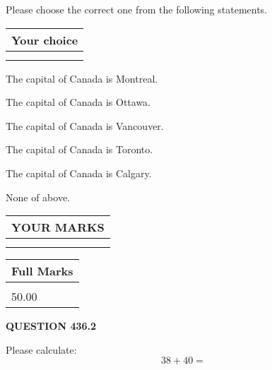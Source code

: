 \documentclass[12pt]{article}
\begin{document}
  
Please choose the correct one from the following statements.
  
  
\noindent\hspace{3.0in} \begin{tabular}{|l|}
\hline
Your choice \\
\hline
 \\ 
 \\ 
\hline
\end{tabular}
  
  
 
 
The capital of Canada is Montreal.
 
 
The capital of Canada is Ottawa.
 
 
The capital of Canada is Vancouver.
 
 
The capital of Canada is Toronto.
 
 
The capital of Canada is Calgary.
 
 
 None of above.
 
 
  
\vspace{0.2in}
  
\noindent\begin{tabular}{|l|}
\hline
 YOUR MARKS  \\
\hline
 \\ 
 \\ 
\hline
\end{tabular}
\hspace{0.05in} \begin{tabular}{|l|}
\hline
 Full Marks  \\
\hline
 \\ 
50.00 \\
\hline
\end{tabular}
{\textbf{\Large{QUESTION
436.2 
}}}
  
  
 
Please calculate:
\begin{equation}
38 +  %
40 = \nonumber
\end{equation}
 

 

 
   
   
 \vspace{0.2in}
 
   
   
   
   
\end{document}
